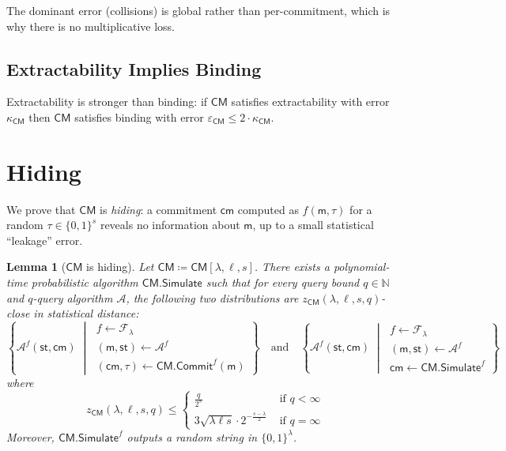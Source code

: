 \documentclass{article}
\newtheorem{lemma}{Lemma}
\newcommand{\Naturals}{\mathbb{N}}
\newcommand{\Bits}{\{0,1\}}
\newcommand{\DefineEqual}{\coloneqq}
\newcommand{\TextAndInMath}{\quad\text{and}\quad}
\newcommand{\GivenExperiment}{\;\middle|\;}
\newcommand{\StateExperiment}[1]{\begin{array}{l}#1\end{array}}
\newcommand{\ROFunction}{f}
\newcommand{\RODistribution}[1]{\mathcal{F}_{#1}}
\newcommand{\ROOutputSize}{\lambda}
\newcommand{\ROQueryBound}{q}
\newcommand{\ROAdvState}{\mathsf{st}}
\newcommand{\ProtoSalt}{\tau}
\newcommand{\ProtoSoundnessError}{\varepsilon}
\newcommand{\ProtoKnowledgeError}{\kappa}
\newcommand{\ProtoAdversary}{\mathcal{A}}
\newcommand{\CMSymbol}{\mathsf{CM}}
\newcommand{\CMSubscript}{\scriptscriptstyle\CMSymbol}
\newcommand{\CMConstructor}[3]{\CMSymbol[#1,#2,#3]}
\newcommand{\CMCommit}{\CMSymbol.\mathsf{Commit}}
\newcommand{\CMSimulator}{\CMSymbol.\mathsf{Simulate}}
\newcommand{\CMMessageLength}{\ell}
\newcommand{\CMSaltSize}{s}
\newcommand{\CMCommitment}{\mathsf{cm}}
\newcommand{\CMMessage}{\mathsf{m}}
\newcommand{\CMSaltString}{\ProtoSalt}
\newcommand{\CMBindingError}{\ProtoSoundnessError_{\CMSubscript}}
\newcommand{\CMExtractionError}{\ProtoKnowledgeError_{\CMSubscript}}
\newcommand{\CMHidingError}{z_{\CMSubscript}}
\newcommand{\CMAdversary}{\ProtoAdversary}
\newcommand{\CMHidingExpressionFinite}[2]{\frac{#2}{2^{#1}}}
\newcommand{\CMHidingExpressionInfinite}[1]{3 \sqrt{\ROOutputSize \CMMessageLength #1} \cdot 2^{-\frac{#1 - \ROOutputSize}{2}}}
\begin{document}
The dominant error (collisions) is global rather than per-commitment, which is why there is no multiplicative loss.

\subsection{Extractability Implies Binding}

Extractability is stronger than binding: if $\CMSymbol$ satisfies extractability with error $\CMExtractionError$ then $\CMSymbol$ satisfies binding with error $\CMBindingError \leq 2 \cdot \CMExtractionError$.

\section{Hiding}
\label{section:basic-commitment-hiding}

We prove that $\CMSymbol$ is \emph{hiding}: a commitment $\CMCommitment$ computed as $\ROFunction(\CMMessage,\CMSaltString)$ for a random $\CMSaltString \in \Bits^{\CMSaltSize}$ reveals no information about $\CMMessage$, up to a small statistical ``leakage'' error.

\begin{lemma}[$\CMSymbol$ is hiding]
\label{lemma:cm-hiding}
Let $\CMSymbol \DefineEqual \CMConstructor{\ROOutputSize}{\CMMessageLength}{\CMSaltSize}$. There exists a polynomial-time probabilistic algorithm $\CMSimulator$ such that for every query bound $\ROQueryBound \in \Naturals$ and $\ROQueryBound$-query algorithm $\CMAdversary$, the following two distributions are $\CMHidingError(\ROOutputSize,\CMMessageLength,\CMSaltSize,\ROQueryBound)$-close in statistical distance:
\begin{equation*}
\left\{
\CMAdversary^{\ROFunction}(\ROAdvState,\CMCommitment)
\GivenExperiment
\StateExperiment{
\ROFunction \gets \RODistribution{\ROOutputSize} \\
(\CMMessage,\ROAdvState) \gets \CMAdversary^{\ROFunction} \\
(\CMCommitment,\CMSaltString) \gets \CMCommit^{\ROFunction}(\CMMessage)
}
\right\}
\TextAndInMath
\left\{
\CMAdversary^{\ROFunction}(\ROAdvState,\CMCommitment)
\GivenExperiment
\StateExperiment{
\ROFunction \gets \RODistribution{\ROOutputSize} \\
(\CMMessage,\ROAdvState) \gets \CMAdversary^{\ROFunction} \\
\CMCommitment \gets \CMSimulator^{\ROFunction}
}
\right\}
\end{equation*}
where
\begin{equation*}
\CMHidingError(\ROOutputSize,\CMMessageLength,\CMSaltSize,\ROQueryBound)
\leq
\begin{cases}
\CMHidingExpressionFinite{\CMSaltSize}{\ROQueryBound}
& \text{ if $\ROQueryBound<\infty$} \\
\CMHidingExpressionInfinite{\CMSaltSize}
& \text{ if $\ROQueryBound=\infty$}
\end{cases}
\end{equation*}
Moreover, $\CMSimulator^{\ROFunction}$ outputs a random string in $\Bits^{\ROOutputSize}$.
\end{lemma}
\end{document}
